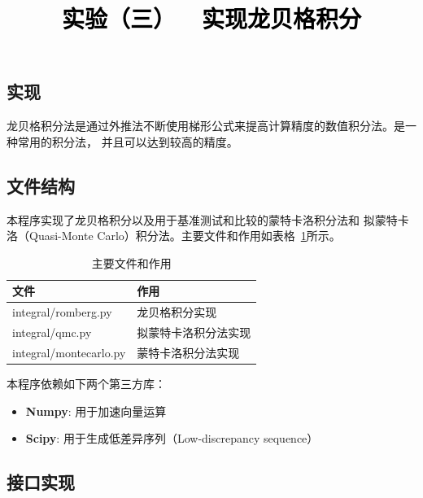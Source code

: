 \documentclass[a4paper,twoside]{article}
\newcommand{\PaperTitle}{实验（三）\ \ 实现龙贝格积分}  %
\begin{document}
\newpage

\title{
	\Large{\textcolor{black}{\PaperTitle}}
}
	
	
\maketitle
	
\tableofcontents
 
\newpage
\setcounter{page}{1}

\begin{spacing}{1.2}

\section{实现}

龙贝格积分法是通过外推法不断使用梯形公式来提高计算精度的数值积分法。是一种常用的积分法，
并且可以达到较高的精度。

\subsection{文件结构}

本程序实现了龙贝格积分以及用于基准测试和比较的蒙特卡洛积分法和
拟蒙特卡洛（Quasi-Monte Carlo）积分法。主要文件和作用如表格~\ref{tbl:struct}所示。

\begin{table}[htbp]
	\centering
	\renewcommand\arraystretch{1.5}
	\begin{tabular}{p{4cm}p{6cm}}
		\toprule
		文件 & 作用 \\
		\midrule
		integral/romberg.py & 龙贝格积分实现 \\
		\hline
		integral/qmc.py & 拟蒙特卡洛积分法实现 \\
		\hline
		integral/montecarlo.py & 蒙特卡洛积分法实现 \\
		\bottomrule
	\end{tabular}
	\label{tbl:struct}
	\caption{主要文件和作用}
\end{table}

本程序依赖如下两个第三方库：
\begin{itemize}
	\item \textbf{Numpy}: 用于加速向量运算
	\item \textbf{Scipy}: 用于生成低差异序列（Low-discrepancy sequence）
\end{itemize}

\subsection{接口实现}


\end{spacing}
\end{document}
